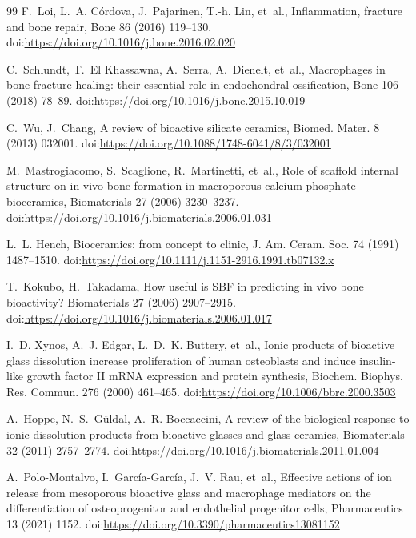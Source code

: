 \documentclass[11pt]{article}
\begin{document}
\begin{thebibliography}{99}
F.~Loi, L.~A. C\'ordova, J.~Pajarinen, T.-h. Lin, et~al., Inflammation, fracture and bone repair, Bone 86 (2016) 119--130.
\newblock doi:\url{https://doi.org/10.1016/j.bone.2016.02.020}


C.~Schlundt, T.~El Khassawna, A.~Serra, A.~Dienelt, et~al., Macrophages in bone fracture healing: their essential role in endochondral ossification, Bone 106 (2018) 78--89.
\newblock doi:\url{https://doi.org/10.1016/j.bone.2015.10.019}


C.~Wu, J.~Chang, A review of bioactive silicate ceramics, Biomed. Mater. 8 (2013) 032001.
\newblock doi:\url{https://doi.org/10.1088/1748-6041/8/3/032001}


M.~Mastrogiacomo, S.~Scaglione, R.~Martinetti, et~al., Role of scaffold internal structure on in vivo bone formation in macroporous calcium phosphate bioceramics, Biomaterials 27 (2006) 3230--3237.
\newblock doi:\url{https://doi.org/10.1016/j.biomaterials.2006.01.031}


L.~L. Hench, Bioceramics: from concept to clinic, J. Am. Ceram. Soc. 74 (1991) 1487--1510.
\newblock doi:\url{https://doi.org/10.1111/j.1151-2916.1991.tb07132.x}


T.~Kokubo, H.~Takadama, How useful is SBF in predicting in vivo bone bioactivity? Biomaterials 27 (2006) 2907--2915.
\newblock doi:\url{https://doi.org/10.1016/j.biomaterials.2006.01.017}


I.~D. Xynos, A.~J. Edgar, L.~D.~K. Buttery, et~al., Ionic products of bioactive glass dissolution increase proliferation of human osteoblasts and induce insulin-like growth factor II mRNA expression and protein synthesis, Biochem. Biophys. Res. Commun. 276 (2000) 461--465.
\newblock doi:\url{https://doi.org/10.1006/bbrc.2000.3503}


A.~Hoppe, N.~S.~G\"uldal, A.~R. Boccaccini, A review of the biological response to ionic dissolution products from bioactive glasses and glass-ceramics, Biomaterials 32 (2011) 2757--2774.
\newblock doi:\url{https://doi.org/10.1016/j.biomaterials.2011.01.004}


A.~Polo-Montalvo, I.~Garc\'ia-Garc\'ia, J.~V. Rau, et~al., Effective actions of ion release from mesoporous bioactive glass and macrophage mediators on the differentiation of osteoprogenitor and endothelial progenitor cells, Pharmaceutics 13 (2021) 1152.
\newblock doi:\url{https://doi.org/10.3390/pharmaceutics13081152}



\end{thebibliography}
\end{document}

